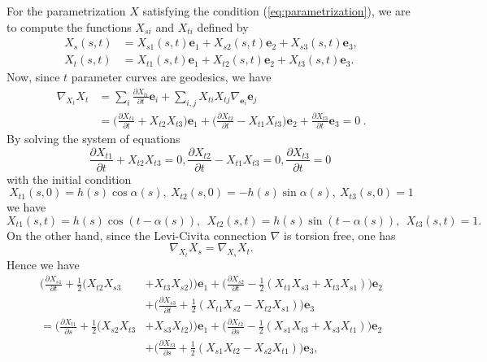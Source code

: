 \documentclass[11pt]{amsart}
\begin{document}
For the parametrization $X$ satisfying the condition
(\ref{eq:parametrization}), we are to compute the functions
$X_{si}$ and $X_{ti}$ defined by
\[
   \begin{aligned}
    X_s (s,t) &= X_{s1} (s,t){\mathbf{e}}_1 + X_{s2} (s,t){\mathbf{e}}_2 + X_{s3} (s,t){\mathbf{e}}_3, \\
    X_t (s,t) &= X_{t1} (s,t){\mathbf{e}}_1 + X_{t2} (s,t){\mathbf{e}}_2 + X_{t3}
    (s,t){\mathbf{e}}_3.
   \end{aligned}
\]
Now, since $t$ parameter curves are geodesics, we have
\[  \begin{split}
    \nabla_{X_t} X_t
        &= \sum_i \frac{\partial X_{ti}}{\partial t} {\mathbf{e}}_i
           + \sum_{i,j} X_{ti}X_{tj} \nabla_{{\mathbf{e}}_i} {\mathbf{e}}_j  \\
        &= \bigg( \frac{\partial X_{t1}}{\partial t} + X_{t2}X_{t3} \bigg) {\mathbf{e}}_1
           + \bigg( \frac{\partial X_{t2}}{\partial t} - X_{t1}X_{t3} \bigg) {\mathbf{e}}_2
           + \frac{\partial X_{t3}}{\partial t} {\mathbf{e}}_3
         = 0 \ .
\end{split}   \]
By solving the system of equations
\[  \frac{\partial X_{t1}}{\partial t} + X_{t2}X_{t3} =0,
    \frac{\partial X_{t2}}{\partial t} - X_{t1}X_{t3} =0,
    \frac{\partial X_{t3}}{\partial t} = 0 \    \]
with the initial condition
\[  X_{t1}(s,0)=h(s)\cos\alpha (s), \
    X_{t2}(s,0)= -h(s) \sin \alpha (s), \
    X_{t3}(s,0)=1   \]
we have
\[   X_{t1} (s,t) = h(s) \cos ( t-\alpha(s)),\ \
     X_{t2} (s,t) = h(s) \sin ( t-\alpha(s)),\ \
     X_{t3} (s,t) = 1.      \]
On the other hand, since the Levi-Civita connection $\nabla$ is
torsion free, one has
$$\nabla_{X_t} X_s = \nabla_{X_s} X_t.$$
Hence we have
\[  \begin{split}
     \bigg( \frac{\partial X_{s1}}{\partial t}
              + \frac12(X_{t2}X_{s3}&+X_{t3}X_{s2}) \bigg) {\mathbf{e}}_1
     + \bigg( \frac{\partial X_{s2}}{\partial t}
              - \frac12(X_{t1}X_{s3}+X_{t3}X_{s1}) \bigg){\mathbf{e}}_2  \\
     &+ \bigg( \frac{\partial X_{s3}}{\partial t}
              +\frac12(X_{t1}X_{s2} - X_{t2}X_{s1}) \bigg){\mathbf{e}}_3   \\
  =  \bigg( \frac{\partial X_{t1}}{\partial s}
              + \frac12(X_{s2}X_{t3}&+X_{s3}X_{t2}) \bigg) {\mathbf{e}}_1
     + \bigg( \frac{\partial X_{t2}}{\partial s}
              - \frac12(X_{s1}X_{t3}+X_{s3}X_{t1}) \bigg){\mathbf{e}}_2   \\
     &+ \bigg( \frac{\partial X_{t3}}{\partial s}
              +\frac12(X_{s1}X_{t2} - X_{s2}X_{t1}) \bigg){\mathbf{e}}_3,
\end{split}       \]
\end{document}
